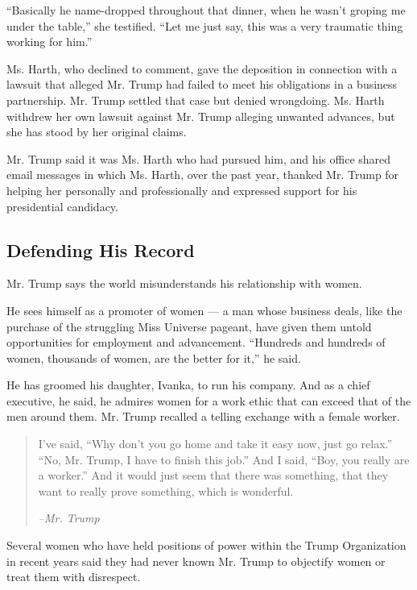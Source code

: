 ``Basically he name-dropped throughout that dinner, when he wasn't
groping me under the table,'' she testified. ``Let me just say, this was
a very traumatic thing working for him.''

Ms. Harth, who declined to comment, gave the deposition in connection
with a lawsuit that alleged Mr. Trump had failed to meet his obligations
in a business partnership. Mr. Trump settled that case but denied
wrongdoing. Ms. Harth withdrew her own lawsuit against Mr. Trump
alleging unwanted advances, but she has stood by her original claims.

Mr. Trump said it was Ms. Harth who had pursued him, and his office
shared email messages in which Ms. Harth, over the past year, thanked
Mr. Trump for helping her personally and professionally and expressed
support for his presidential candidacy.

\hypertarget{defending-his-record}{%
\subsection{Defending His Record}\label{defending-his-record}}

Mr. Trump says the world misunderstands his relationship with women.

He sees himself as a promoter of women --- a man whose business deals,
like the purchase of the struggling Miss Universe pageant, have given
them untold opportunities for employment and advancement. ``Hundreds and
hundreds of women, thousands of women, are the better for it,'' he said.

He has groomed his daughter, Ivanka, to run his company. And as a chief
executive, he said, he admires women for a work ethic that can exceed
that of the men around them. Mr. Trump recalled a telling exchange with
a female worker.

\begin{quote}
I've said, ``Why don't you go home and take it easy now, just go
relax.'' ``No, Mr. Trump, I have to finish this job.'' And I said,
``Boy, you really are a worker.'' And it would just seem that there was
something, that they want to really prove something, which is wonderful.

\emph{--Mr. Trump}
\end{quote}

Several women who have held positions of power within the Trump
Organization in recent years said they had never known Mr. Trump to
objectify women or treat them with disrespect.

